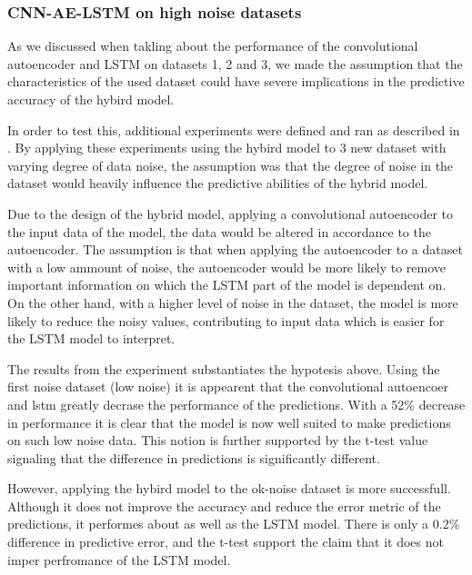 \subsubsection{CNN-AE-LSTM on high noise datasets}

As we discussed when takling about the performance of the convolutional autoencoder and LSTM on datasets 1, 2 and 3,
we made the assumption that the characteristics of the used dataset could have severe implications in the predictive accuracy of the hybird model.

In order to test this, additional experiments were defined and ran as described in .
By applying these experiments using the hybird model to 3 new dataset with varying degree of data noise,
the assumption was that the degree of noise in the dataset would heavily influence the predictive abilities of the hybrid model.

Due to the design of the hybrid model, applying a convolutional autoencoder to the input data of the model,
the data would be altered in accordance to the autoencoder.
The assumption is that when applying the autoencoder to a dataset with a low ammount of noise,
the autoencoder would be more likely to remove important information on which the LSTM part of the model is dependent on.
On the other hand, with a higher level of noise in the dataset,
the model is more likely to reduce the noisy values, contributing to input data which is easier for the LSTM model to interpret.


The results from the experiment substantiates the hypotesis above.
Using the first noise dataset (low noise) it is appearent that the convolutional autoencoer and lstm greatly decrase the performance of the predictions.
With a 52\% decrease in performance it is clear that the model is now well suited to make predictions on such low noise data.
This notion is further supported by the t-test value signaling that the difference in predictions is significantly different.

However, applying the hybird model to the ok-noise dataset is more successfull.
Although it does not improve the accuracy and reduce the error metric of the predictions,
it performes about as well as the LSTM model. There is only a 0.2\% difference in predictive error,
and the t-test support the claim that it does not imper perfromance of the LSTM model.

